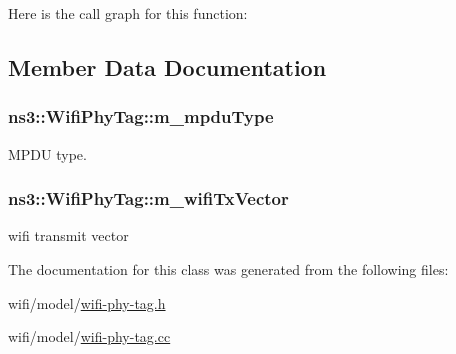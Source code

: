 Here is the call graph for this function\+:




\subsection{Member Data Documentation}
\subsubsection[{\texorpdfstring{m\+\_\+mpdu\+Type}{m_mpduType}}]{ ns3\+::\+Wifi\+Phy\+Tag\+::m\+\_\+mpdu\+Type\hspace{0.3cm}{\ttfamily [private]}}\hypertarget{classns3_1_1WifiPhyTag_ae25916f5726cb17f21de9f16f0684e9f}{}\label{classns3_1_1WifiPhyTag_ae25916f5726cb17f21de9f16f0684e9f}


M\+P\+DU type. 

\subsubsection[{\texorpdfstring{m\+\_\+wifi\+Tx\+Vector}{m_wifiTxVector}}]{ ns3\+::\+Wifi\+Phy\+Tag\+::m\+\_\+wifi\+Tx\+Vector\hspace{0.3cm}{\ttfamily [private]}}\hypertarget{classns3_1_1WifiPhyTag_abc94baf66b26c043e6a941c9f690b2a9}{}\label{classns3_1_1WifiPhyTag_abc94baf66b26c043e6a941c9f690b2a9}


wifi transmit vector 



The documentation for this class was generated from the following files\+:\begin{DoxyCompactItemize}
\item 
wifi/model/\hyperlink{wifi-phy-tag_8h}{wifi-\/phy-\/tag.\+h}\item 
wifi/model/\hyperlink{wifi-phy-tag_8cc}{wifi-\/phy-\/tag.\+cc}\end{DoxyCompactItemize}
